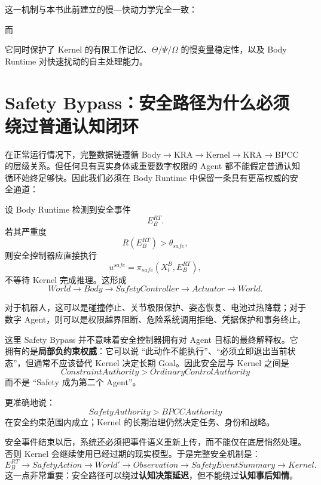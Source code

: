 这一机制与本书此前建立的慢—快动力学完全一致：
\begin{statementbox}
\centering
{}
\end{statementbox}
而
\begin{statementbox}
\centering
{}
\end{statementbox}
它同时保护了 Kernel 的有限工作记忆、$\Theta/\Psi/\Omega$ 的慢变量稳定性，以及 Body Runtime 对快速扰动的自主处理能力。


\section{Safety Bypass：安全路径为什么必须绕过普通认知闭环}

在正常运行情况下，完整数据链遵循 Body$\rightarrow$KRA$\rightarrow$Kernel$\rightarrow$KRA$\rightarrow$BPCC 的层级关系。但任何具有真实身体或重要数字权限的 Agent 都不能假定普通认知循环始终足够快。因此我们必须在 Body Runtime 中保留一条具有更高权威的安全通道：
\begin{statementbox}
\centering
{}
\end{statementbox}

设 Body Runtime 检测到安全事件
\[
E^{RT}_B .
\]
若其严重度
\[
R(E^{RT}_B)
>
\theta_{safe},
\]
则安全控制器应直接执行
\[
u^{safe}
=
\pi_{safe}
\left(
X^B_t,
E^{RT}_B
\right),
\]
不等待 Kernel 完成推理。这形成
\[
World
\rightarrow
Body
\rightarrow
SafetyController
\rightarrow
Actuator
\rightarrow
World .
\]

对于机器人，这可以是碰撞停止、关节极限保护、姿态恢复、电池过热降载；对于数字 Agent，则可以是权限越界阻断、危险系统调用拒绝、凭据保护和事务终止。

这里 Safety Bypass 并不意味着安全控制器拥有对 Agent 目标的最终解释权。它拥有的是\textbf{局部负约束权威}：它可以说 ``此动作不能执行''、``必须立即退出当前状态''，但通常不应该替代 Kernel 决定长期 Goal。因此安全层与 Kernel 之间是
\[
\boxed{
ConstraintAuthority
>
OrdinaryControlAuthority
}
\]
而不是 ``Safety 成为第二个 Agent''。

更准确地说：
\[
\boxed{
SafetyAuthority
>
BPCCAuthority
}
\]
在安全约束范围内成立；Kernel 的长期治理仍然决定任务、身份和战略。

安全事件结束以后，系统还必须把事件语义重新上传，而不能仅在底层悄然处理。否则 Kernel 会继续使用已经过期的现实模型。于是完整安全机制是：
\[
E_B^{RT}
\rightarrow
SafetyAction
\rightarrow
World'
\rightarrow
Observation
\rightarrow
SafetyEventSummary
\rightarrow
Kernel .
\]
这一点非常重要：安全路径可以绕过\textbf{认知决策延迟}，但不能绕过\textbf{认知事后知情}。


